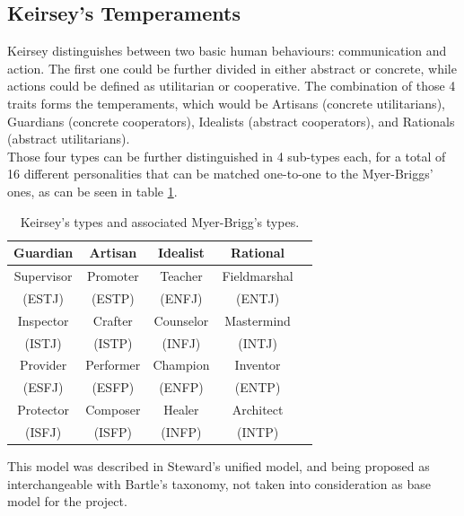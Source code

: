 \subsection{Keirsey's Temperaments}
Keirsey distinguishes between two basic human behaviours: communication and action. The first one could be further divided in either abstract or concrete, while actions could be defined as utilitarian or cooperative. The combination of those 4 traits forms the temperaments, which would be Artisans (concrete utilitarians), Guardians (concrete cooperators), Idealists (abstract cooperators), and Rationals (abstract utilitarians)\cite{keirsey1998please}.\\
Those four types can be further distinguished in 4 sub-types each, for a total of 16 different personalities that can be matched one-to-one to the Myer-Briggs' ones, as can be seen in table \ref{tab:keirsey-myers}.
\begin{table}[ht]
	\centering
    \scriptsize
	\caption{Keirsey's types and associated Myer-Brigg's types.}
    \begin{tabular}{|c|c|c|c|c|}
    	\hline
        Guardian & Artisan & Idealist & Rational\\
        \hline
        Supervisor & Promoter & Teacher & Fieldmarshal\\
        (ESTJ) & (ESTP) & (ENFJ) & (ENTJ)\\
        \hline
         Inspector & Crafter & Counselor & Mastermind\\
         (ISTJ) & (ISTP) & (INFJ) & (INTJ)\\
         \hline
         Provider & Performer & Champion & Inventor\\
         (ESFJ) & (ESFP) & (ENFP) & (ENTP)\\
         \hline
         Protector & Composer & Healer & Architect\\
         (ISFJ) & (ISFP) & (INFP) & (INTP)\\
		\hline
    \end{tabular}
    \label{tab:keirsey-myers}
\end{table}
This model was described in Steward's unified model\cite{stewart2011personality}, and being proposed as interchangeable with Bartle's taxonomy, not taken into consideration as base model for the project.\\
